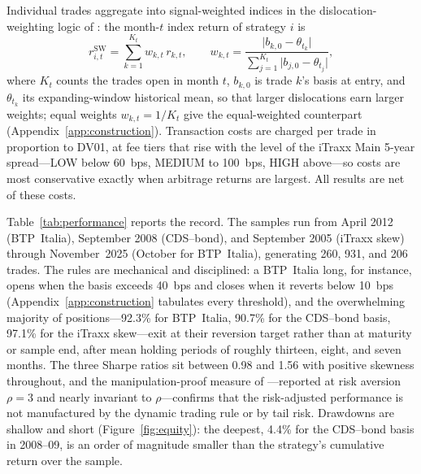 Individual trades aggregate into signal-weighted indices in the
dislocation-weighting logic of \citet{rebonato2021convexity}: the month-$t$
index return of strategy $i$ is
\begin{equation}
r^{\mathrm{SW}}_{i,t}=\sum_{k=1}^{K_t} w_{k,t}\, r_{k,t},\qquad
w_{k,t}=\frac{\lvert b_{k,0}-\theta_{t_k}\rvert}
{\sum_{j=1}^{K_t}\lvert b_{j,0}-\theta_{t_j}\rvert},
\end{equation}
where $K_t$ counts the trades open in month $t$, $b_{k,0}$ is trade $k$'s
basis at entry, and $\theta_{t_k}$ its expanding-window historical mean, so
that larger dislocations earn larger weights; equal weights $w_{k,t}=1/K_t$
give the equal-weighted counterpart (Appendix~\ref{app:construction}). Transaction costs are charged per trade in
proportion to DV01, at fee tiers that rise with the level of the iTraxx Main
5-year spread---LOW below 60~bps, MEDIUM to 100~bps, HIGH above---so costs are
most conservative exactly when arbitrage returns are largest. All results are
net of these costs.

Table~\ref{tab:performance} reports the record. The samples run from April
2012 (BTP~Italia), September 2008 (CDS--bond), and September 2005 (iTraxx
skew) through November~2025 (October for BTP~Italia), generating 260, 931, and 206 trades.
The rules are mechanical and disciplined: a BTP~Italia long, for instance,
opens when the basis exceeds 40~bps and closes when it reverts below 10~bps
(Appendix~\ref{app:construction} tabulates every threshold), and the
overwhelming majority of positions---92.3\% for BTP~Italia, 90.7\% for the
CDS--bond basis, 97.1\% for the iTraxx skew---exit at their reversion target
rather than at maturity or sample end, after mean holding periods of roughly
thirteen, eight, and seven months.
The three Sharpe ratios sit between 0.98 and 1.56 with positive skewness
throughout, and the manipulation-proof measure of
\citet{goetzmann2007portfolio}---reported at risk aversion $\rho=3$ and nearly
invariant to $\rho$---confirms that the risk-adjusted performance is not
manufactured by the dynamic trading rule or by tail risk. Drawdowns are
shallow and short (Figure~\ref{fig:equity}): the deepest, 4.4\% for the
CDS--bond basis in 2008--09, is
an order of magnitude smaller than the strategy's cumulative return over the
sample.


